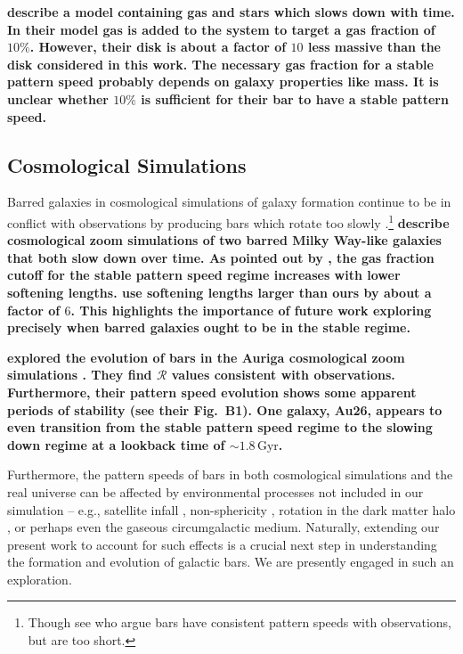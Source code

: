\documentclass[twocolumn,linenumbers,trackchanges]{aastex631}
\newcommand{\Rot}{\ensuremath{\mathcal{R}}}
\begin{document}
{\bf \citet{2015MNRAS.454.3166A} describe a model containing gas and stars which
slows down with time. In their model gas is added to the system to target a gas
fraction of $10\%$. However, their disk is about a factor of $10$ less massive
than the disk considered in this work. The necessary gas fraction for a stable
pattern speed probably depends on galaxy properties like mass. It is unclear
whether $10\%$ is sufficient for their bar to have a stable pattern speed.}

\subsection{Cosmological Simulations}
Barred galaxies in cosmological simulations of galaxy formation continue to be
in conflict with observations by producing bars which rotate too slowly
\citep{2017MNRAS.469.1054A, 2019MNRAS.483.2721P, 2021AA...650L..16F,
2022ApJ...940...61F}.\footnote{Though see \citet{2022ApJ...940...61F} who argue
bars have consistent pattern speeds with observations, but are too short.}
{\bf \citet{2015PASJ...67...63O} describe cosmological zoom simulations of two barred
Milky Way-like galaxies that both slow down over time. As pointed out by
\citet{2010ApJ...719.1470V}, the gas fraction cutoff for the stable pattern
speed regime increases with lower softening lengths. \citet{2015PASJ...67...63O}
use softening lengths larger than ours by about a factor of $6$. This highlights
the importance of future work exploring precisely when barred galaxies ought to
be in the stable regime.}

{\bf \citet{2021AA...650L..16F} explored the evolution of bars in the Auriga
cosmological zoom simulations \citep{2017MNRAS.467..179G}. They find \Rot{}
values consistent with observations. Furthermore, their pattern speed evolution
shows some apparent periods of stability (see their Fig.~B1). One galaxy, Au26,
appears to even transition from the stable pattern speed regime to the slowing
down regime at a lookback time of $\sim1.8\,\textrm{Gyr}$.}

Furthermore, the pattern speeds of bars in both cosmological simulations and the
real universe can be affected by environmental processes not included in our
simulation -- e.g., satellite infall \citep{2011Natur.477..301P}, non-sphericity
\citep{2013MNRAS.429.1949A}, rotation in the dark matter halo
\citep{2013MNRAS.434.1287S, 2014ApJ...783L..18L, 2018MNRAS.476.1331C,
2019MNRAS.488.5788C}, or perhaps even the gaseous circumgalactic medium.
Naturally, extending our present work to account for such effects is a crucial
next step in understanding the formation and evolution of galactic bars. We are
presently engaged in such an exploration.
\end{document}
